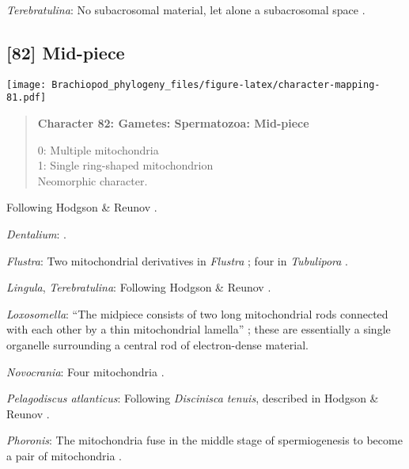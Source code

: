 \documentclass[openany]{book}
\theoremstyle{definition}
\theoremstyle{definition}
\theoremstyle{definition}
\theoremstyle{remark}
\begin{document}
\hypertarget{Terebratulina-coding-81}{}
\emph{Terebratulina}: No subacrosomal material, let alone a subacrosomal
space \citep[e.g.][]{Hodgson1994Ultrastructureof}.

\subsection*{{[}82{]} Mid-piece}\label{mid-piece}

\texttt{[image: Brachiopod\_phylogeny\_files/figure-latex/character-mapping-81.pdf]}

\begin{quote}
\textbf{Character 82: Gametes: Spermatozoa: Mid-piece}

0: Multiple mitochondria\\
1: Single ring-shaped mitochondrion\\
Neomorphic character.
\end{quote}

Following Hodgson \& Reunov \citeyearpar{Hodgson1994Ultrastructureof}.

\hypertarget{Dentalium-coding-82}{}
\emph{Dentalium}: \citet{DufresneDube1983}.

\hypertarget{Flustra-coding-82}{}
\emph{Flustra}: Two mitochondrial derivatives in \emph{Flustra}
\citep{Franzen1981, Franzen2013}; four in \emph{Tubulipora}
\citep{Franzen1984}.

\hypertarget{Lingula-coding-82}{}
\emph{Lingula}, \emph{Terebratulina}: Following Hodgson \& Reunov
\citeyearpar{Hodgson1994Ultrastructureof}.

\hypertarget{Loxosomella-coding-82}{}
\emph{Loxosomella}: ``The midpiece consists of two long mitochondrial
rods connected with each other by a thin mitochondrial lamella''
\citep[in \emph{Loxosoma}]{Franzen2000}; these are essentially a single
organelle surrounding a central rod of electron-dense material.

\hypertarget{Novocrania-coding-82}{}
\emph{Novocrania}: Four mitochondria \citep{Afzelius1978Finestructure}.

\hypertarget{Pelagodiscus_atlanticus-coding-82}{}
\emph{Pelagodiscus atlanticus}: Following \emph{Discinisca}
\emph{tenuis}, described in Hodgson \& Reunov
\citeyearpar{Hodgson1994Ultrastructureof}.

\hypertarget{Phoronis-coding-82}{}
\emph{Phoronis}: The mitochondria fuse in the middle stage of
spermiogenesis to become a pair of mitochondria
\citep{Reunov2004Ultrastructuralstudy}.
\end{document}
